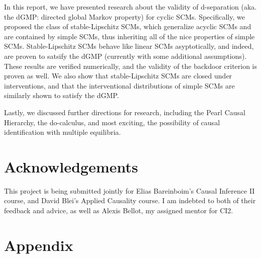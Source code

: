 \documentclass[letterpaper,10pt]{article}
\begin{document}
In this report, we have presented research about the validity of d-separation (aka. the dGMP: directed global Markov property) for cyclic SCMs. Specifically, we proposed the class of stable-Lipschitz SCMs, which generalize acyclic SCMs and are contained by simple SCMs, thus inheriting all of the nice properties of simple SCMs. Stable-Lipschitz SCMs behave like linear SCMs asyptotically, and indeed, are proven to satsify the dGMP (currently with some additional assumptions).
These results are verified numerically, and the validity of the backdoor criterion is proven as well. We also show that stable-Lipschitz SCMs are closed under interventions, and that the interventional distributions of simple SCMs are similarly shown to satisfy the dGMP.

Lastly, we discussed further directions for research, including the Pearl Causal Hierarchy, the do-calculus, and most exciting, the possibility of causal identification with multiple equilibria.

\section{Acknowledgements}
This project is being submitted jointly for Elias Bareinboim's Causal Inference II course, and David Blei's Applied Causality course. I am indebted to both of their feedback and advice, as well as Alexis Bellot, my assigned mentor for CI2.





\section{Appendix}

\end{document}
